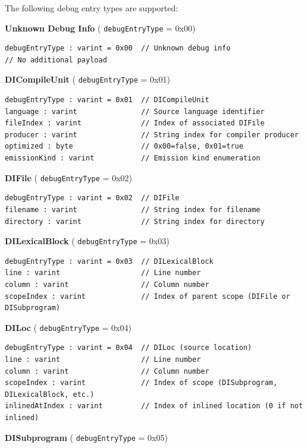 \documentclass{article}
\begin{document}
The following debug entry types are supported:


\textbf{Unknown Debug Info} ( \texttt{debugEntryType} = 0x00)


\begin{lstlisting}
debugEntryType : varint = 0x00  // Unknown debug info
// No additional payload
\end{lstlisting}

\textbf{DICompileUnit} ( \texttt{debugEntryType} = 0x01)


\begin{lstlisting}
debugEntryType : varint = 0x01  // DICompileUnit
language : varint               // Source language identifier
fileIndex : varint              // Index of associated DIFile
producer : varint               // String index for compiler producer
optimized : byte                // 0x00=false, 0x01=true
emissionKind : varint           // Emission kind enumeration
\end{lstlisting}

\textbf{DIFile} ( \texttt{debugEntryType} = 0x02)


\begin{lstlisting}
debugEntryType : varint = 0x02  // DIFile
filename : varint               // String index for filename
directory : varint              // String index for directory
\end{lstlisting}

\textbf{DILexicalBlock} ( \texttt{debugEntryType} = 0x03)


\begin{lstlisting}
debugEntryType : varint = 0x03  // DILexicalBlock
line : varint                   // Line number
column : varint                 // Column number
scopeIndex : varint             // Index of parent scope (DIFile or DISubprogram)
\end{lstlisting}

\textbf{DILoc} ( \texttt{debugEntryType} = 0x04)


\begin{lstlisting}
debugEntryType : varint = 0x04  // DILoc (source location)
line : varint                   // Line number
column : varint                 // Column number
scopeIndex : varint             // Index of scope (DISubprogram, DILexicalBlock, etc.)
inlinedAtIndex : varint         // Index of inlined location (0 if not inlined)
\end{lstlisting}

\textbf{DISubprogram} ( \texttt{debugEntryType} = 0x05)
\end{document}
